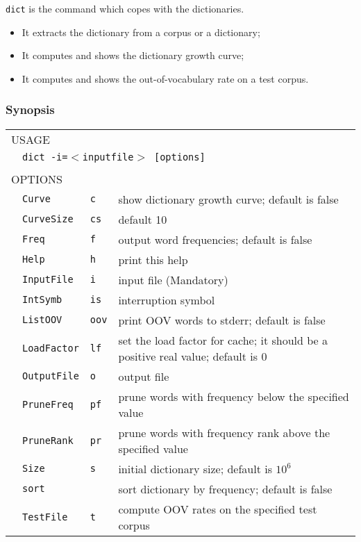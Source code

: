 {\tt dict} is the command which copes with the dictionaries.

\begin{itemize}
\item It extracts the dictionary from a corpus or a dictionary;
\item It computes and shows the dictionary growth curve;
\item It computes and shows the out-of-vocabulary rate on a test corpus.
\end{itemize}

\subsubsection{Synopsis}

\begin{tabular}{llll}
\multicolumn{4}{l}{USAGE}\\
    & \multicolumn{3}{l}{\tt dict -i=$<$inputfile$>$ [options]} \\
    \\
\multicolumn{4}{l}{OPTIONS} \\
    & {\tt Curve}& {\tt c} &      show dictionary growth curve; default is false\\
    & {\tt CurveSize} & {\tt cs} &    default 10\\
    & {\tt Freq} & {\tt f} &    output word frequencies; default is false\\
    & {\tt Help} & {\tt h} &    print this help\\
    & {\tt InputFile} & {\tt i} &    input file (Mandatory)\\
    & {\tt IntSymb} & {\tt is} &    interruption symbol\\
    & {\tt ListOOV} & {\tt oov} &    print OOV words to stderr; default is false\\
    & {\tt LoadFactor} & {\tt lf} &    set the load factor for cache; it should be a positive real value; default is 0\\
    & {\tt OutputFile} & {\tt o} &    output file\\
    & {\tt PruneFreq} & {\tt pf} &    prune words with frequency below the specified value\\
    & {\tt PruneRank} & {\tt pr} &    prune words with frequency rank above the specified value\\
    & {\tt Size} & {\tt s} &    initial dictionary size; default is $10^6$\\
    & {\tt sort} & & sort dictionary by frequency; default is false\\
    & {\tt TestFile} & {\tt t} &    compute OOV rates on the specified test corpus\\
\end{tabular}


